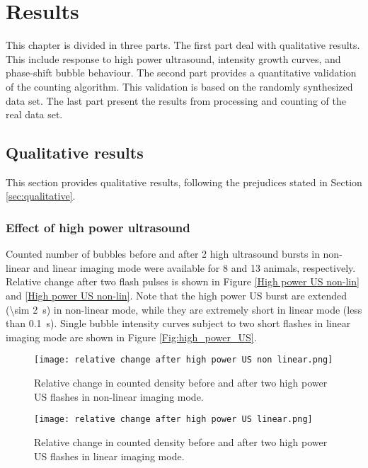 \section{Results}
This chapter is divided in three parts. The first part deal with qualitative results. This include response to high power ultrasound, intensity growth curves, and phase-shift bubble behaviour. The second part provides a quantitative validation of the counting algorithm. This validation is based on the randomly synthesized data set. The last part present the results from processing and counting of the real data set. 
 
\subsection{Qualitative results}
This section provides qualitative results, following the prejudices stated in Section \ref{sec:qualitative}.
\subsubsection{Effect of high power ultrasound}

Counted number of bubbles before and after 2 high ultrasound bursts in non-linear and linear imaging mode were available for 8 and 13 animals, respectively. Relative change after two flash pulses is shown in Figure \ref{High power US non-lin} and \ref{High power US non-lin}. Note that the high power US burst are extended (\SI{\sim 2}{\second}) in non-linear mode, while they are extremely short in linear mode (less than \SI{0.1}{\second}). Single bubble intensity curves subject to two short flashes in linear imaging mode are shown in Figure \ref{Fig:high_power_US}. 
\begin{figure}
\centering
\begin{minipage}[t]{.45\textwidth}
\centering
\texttt{[image: relative change after high power US non linear.png]}
\caption{Relative change in counted density before and after two high power US flashes in non-linear imaging mode.}
\label{High power US non-lin}
\end{minipage}\hfill
\begin{minipage}[t]{.45\textwidth}
\centering
\texttt{[image: relative change after high power US linear.png]}
\caption{Relative change in counted density before and after two high power US flashes in linear imaging mode.}
\label{High power US lin}
\end{minipage}
\end{figure}

